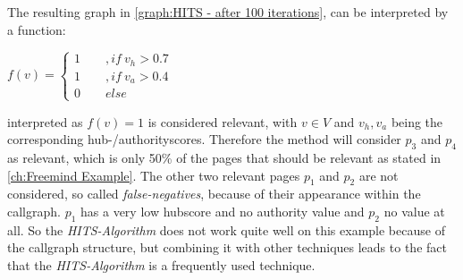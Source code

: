 The resulting graph in \autoref{graph:HITS - after 100 iterations}, can be interpreted by a function:
\begin{center}
	$f(v) = \begin{cases} 1 \qquad ,if \ v_h>0.7\\ 1 \qquad ,if \ v_a > 0.4 \\ 0 \qquad else \end{cases}$
\end{center}
interpreted as $f(v)=1$ is considered relevant, with  $v\in V$ and $v_h, v_a$ being the corresponding hub-/authorityscores. Therefore the method will consider $p_3$ and $p_4$ as relevant, which is only 50\% of the pages that should be relevant as stated in \autoref{ch:Freemind Example}. The other two relevant pages $p_1$ and $p_2$ are not considered, so called \emph{false-negatives}, because of their appearance within the callgraph. $p_1$ has a very low hubscore and no authority value and $p_2$ no value at all. So the \emph{HITS-Algorithm} does not work quite well on this example because of the callgraph structure, but combining it with other techniques leads to the fact that the \emph{HITS-Algorithm} is a frequently used technique.
